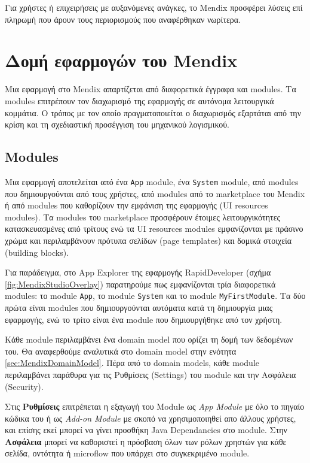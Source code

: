             Για χρήστες ή επιχειρήσεις με αυξανόμενες ανάγκες, το Mendix προσφέρει λύσεις επί πληρωμή που άρουν τους περιορισμούς που αναφέρθηκαν νωρίτερα.


    \section{Δομή εφαρμογών του Mendix}
        Μια εφαρμογή στο Mendix απαρτίζεται από διαφορετικά έγγραφα και modules. Τα modules επιτρέπουν τον διαχωρισμό της εφαρμογής σε αυτόνομα λειτουργικά κομμάτια. Ο τρόπος με τον οποίο πραγματοποιείται ο διαχωρισμός εξαρτάται από την κρίση και τη σχεδιαστική προσέγγιση του μηχανικού λογισμικού.

        \subsection{Modules}
            Μια εφαρμογή αποτελείται από ένα \texttt{App} module, ένα \texttt{System} module, από modules που δημιουργούνται από τους χρήστες, από modules από το marketplace του Mendix ή από modules που καθορίζουν την εμφάνιση της εφαρμογής (UI resources modules). Τα modules του marketplace προσφέρουν έτοιμες λειτουργικότητες κατασκευασμένες από τρίτους ενώ τα UI resources modules εμφανίζονται με πράσινο χρώμα και περιλαμβάνουν πρότυπα σελίδων (page templates) και δομικά στοιχεία (building blocks).

            Για παράδειγμα, στο App Explorer της εφαρμογής RapidDeveloper (σχήμα \ref{fig:MendixStudioOverlay}) παρατηρούμε πως εμφανίζονται τρία διαφορετικά modules: το module \texttt{App}, το module \texttt{System} και το module \texttt{MyFirstModule}. Τα δύο πρώτα είναι modules που δημιουργούνται αυτόματα κατά τη δημιουργία μιας εφαρμογής, ενώ το τρίτο είναι ένα module που δημιουργήθηκε από τον χρήστη.

            Κάθε module περιλαμβάνει ένα domain model που ορίζει τη δομή των δεδομένων του. Θα αναφερθούμε αναλυτικά στο domain model στην ενότητα \ref{sec:MendixDomainModel}. Πέρα από το domain models, κάθε module περιλαμβάνει παράθυρα για τις Ρυθμίσεις (Settings) του module και την Ασφάλεια (Security).

            Στις \textbf{Ρυθμίσεις} επιτρέπεται η εξαγωγή του Module ως \textit{App Module} με όλο το πηγαίο κώδικα του ή ως \textit{Add-on Module} με σκοπό να χρησιμοποιηθεί απο άλλους χρήστες, και επίσης εκεί μπορεί να γίνει προσθήκη Java Dependancies στο module. Στην \textbf{Ασφάλεια} μπορεί να καθοριστεί η πρόσβαση όλων των ρόλων χρηστών για κάθε σελίδα, οντότητα ή microflow που υπάρχει στο συγκεκριμένο module.


